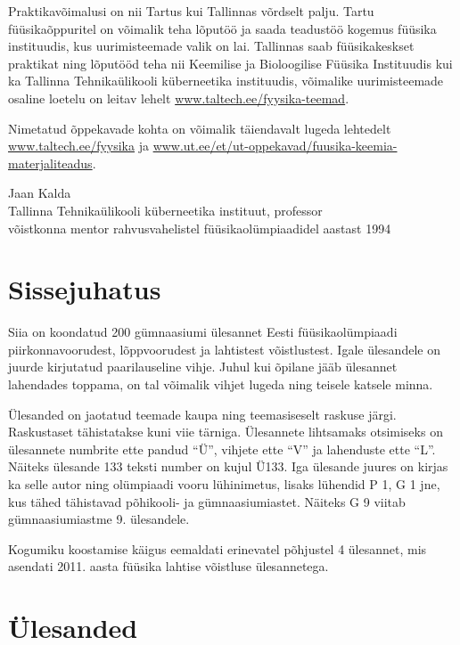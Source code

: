 \documentclass[11pt, twoside]{article}
\begin{document}
{{Praktikavõimalusi on nii Tartus kui Tallinnas võrdselt palju.
Tartu füüsikaõppuritel on võimalik teha lõputöö ja saada teadustöö kogemus füüsika instituudis, kus
uurimisteemade valik on lai.
Tallinnas saab füüsikakeskset praktikat ning lõputööd teha nii Keemilise ja Bioloogilise Füüsika Instituudis kui ka
Tallinna Tehnikaülikooli küberneetika instituudis, võimalike uurimisteemade osaline loetelu on leitav lehelt
\url{www.taltech.ee/fyysika-teemad}.

Nimetatud õppekavade kohta on võimalik täiendavalt lugeda lehtedelt
\url{www.taltech.ee/fyysika} ja
\url{www.ut.ee/et/ut-oppekavad/fuusika-keemia-materjaliteadus}.

\vspace{0.5\baselineskip}\noindent
Jaan Kalda\\
Tallinna Tehnikaülikooli küberneetika instituut, professor\\
võistkonna mentor rahvusvahelistel füüsikaolümpiaadidel aastast 1994}
\fussy

\tableofcontents
\newpage

{\setlength{\parindent}{24pt}
\section{Sissejuhatus}

Siia on koondatud 200 gümnaasiumi ülesannet Eesti füüsikaolümpiaadi piirkonnavoorudest, lõppvoorudest ja lahtistest võistlustest. Igale ülesandele on juurde kirjutatud paarilauseline vihje. Juhul kui õpilane jääb ülesannet lahendades toppama, on tal võimalik vihjet lugeda ning teisele katsele minna.

Ülesanded on jaotatud teemade kaupa ning teemasiseselt raskuse järgi. Raskustaset tähistatakse kuni viie tärniga. Ülesannete lihtsamaks otsimiseks on ülesannete numbrite ette pandud \enquote{Ü}, vihjete ette \enquote{V} ja lahenduste ette \enquote{L}. Näiteks ülesande 133 teksti number on kujul Ü133. Iga ülesande juures on kirjas ka selle autor ning olümpiaadi vooru lühinimetus, lisaks lühendid P 1, G 1 jne, kus tähed tähistavad põhikooli- ja gümnaasiumiastet. Näiteks G 9 viitab gümnaasiumiastme 9. ülesandele.

Kogumiku koostamise käigus eemaldati erinevatel põhjustel 4 ülesannet, mis asendati 2011. aasta füüsika lahtise võistluse ülesannetega.}
\newpage
\setlength{\parindent}{0pt}

        \section{Ülesanded}
        \ToggleStatement
}
\end{document}
